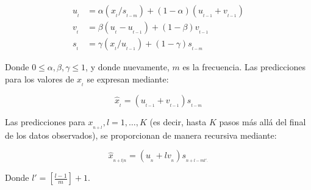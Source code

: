 \documentclass[
  us-letterpaper,
]{scrreprt}
\theoremstyle{definition}
\theoremstyle{plain}
\theoremstyle{plain}
\theoremstyle{definition}
\theoremstyle{remark}
\begin{document}
\[
\begin{split}
u_{_t}&= \alpha(x_{_t}/s_{_{t-m}})+(1-\alpha)(u_{_{t-1}}+v_{_{t-1}})\\
v_{_t}&= \beta(u_{_t}-u_{_{t-1}})+(1-\beta)v_{_{t-1}}\\
s_{_t}&= \gamma(x_{_t}/u_{_{t-1}})+(1-\gamma)s_{_{t-m}}
\end{split}
\]

Donde \(0 \le \alpha, \beta, \gamma \le 1\), y donde nuevamente, \(m\)
es la frecuencia. Las predicciones para los valores de \(x_{_t}\) se
expresan mediante:

\[ \hat{x}_{_t}= (u_{_{t-1}}+v_{_{t-1}})s_{_{t-m}} \]

Las predicciones para \(x_{_{n+l}}, l=1,\ldots,K\) (es decir, hasta
\(K\) pasos más allá del final de los datos observados), se proporcionan
de manera recursiva mediante:

\[
\hat{x}_{_{n+l|n}}=(u_{_n}+lv_{_n})s_{_{n+l-ml'.}}
\]

Donde \(l' =\left[ \frac{l-1}{m} \right] + 1\).
\end{document}
